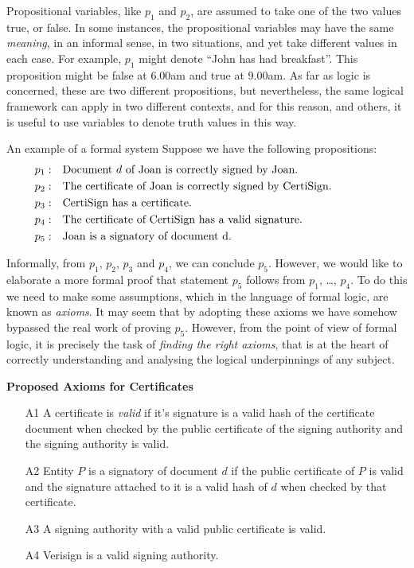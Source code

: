 Propositional variables, like $p_1$ and $p_2$, are assumed to take one of the two values true, or false.
In some instances, the propositional variables may have the same {\em meaning}, in an informal sense,
in two situations, and yet take different values in each case. For example, $p_1$ might denote ``John has
had breakfast''.  This proposition might be false at 6.00am and true at 9.00am. As far as logic is concerned,
these are two different propositions, but nevertheless, the same logical framework can apply in two
different contexts, and for this reason, and others, it is useful to use variables to denote truth values in this way.


\begin{example}{An example of a formal system}\label{certificatesex}%
Suppose we have the following propositions:
\begin{eqnarray}\nonumber
\textup{$p_1$}: &&\parbox{10cm}{Document $d$ of Joan is correctly signed by Joan.}\\\nonumber
\textup{$p_2$}:&& \parbox{10cm}{The certificate of Joan is correctly signed by CertiSign.}\\\nonumber
\textup{$p_3$}:&& \parbox{10cm}{CertiSign has a certificate.}\\\nonumber
\textup{$p_4$}:&& \parbox{10cm}{The certificate of CertiSign has a valid signature.}\\\nonumber
\textup{$p_5$}:&& \parbox{10cm}{Joan is a signatory of document d.}
\end{eqnarray}

Informally, from $p_1$, $p_2$, $p_3$ and $p_4$, we can conclude $p_5$. However, we would like to 
elaborate a more formal proof that statement $p_5$ follows from $p_1$, \dots, $p_4$. To do this
we need to make some assumptions, which in the language of formal logic, are known as {\em axioms}.
It may seem that by adopting these axioms we have somehow bypassed the real work of proving $p_5$.
However, from the point of view of formal logic, it is precisely the task of {\em finding the
right axioms}, that is at the heart of correctly understanding and analysing the logical underpinnings of
any subject.

{\bf Proposed Axioms for Certificates}
\begin{itemize}
	\item[A1] A certificate is {\em valid} if it's signature is a valid hash of 
		the certificate document when checked by the public certificate of
		the signing authority and the signing authority is valid.
	\item[A2] Entity $P$ is a signatory of document $d$ if the public certificate of $P$
		is valid and the signature attached to it is a valid hash of $d$ when checked by that certificate.
	\item[A3] A signing authority with a valid public certificate is valid.
	\item[A4] Verisign is a valid signing authority.
\end{itemize}


\end{example}
